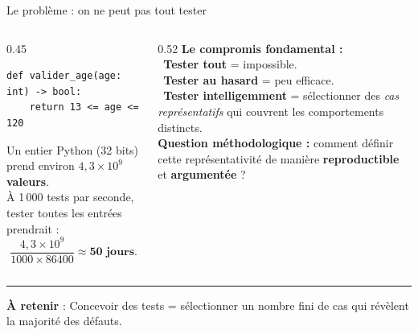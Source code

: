 \documentclass[aspectratio=169,11pt]{beamer}
\newcommand{\takeaway}[1]{%
\vfill\begin{beamercolorbox}[wd=\linewidth,sep=0.4em]{}
\color{accent2}\rule[0.6ex]{1.2em}{1.2pt}\hspace{0.4em}%
\textbf{\color{accent2}\small À retenir} \textcolor{textsoft}{:} %
{\small\color{textmain}#1}
\end{beamercolorbox}}
\newcommand{\oui}[1]{\textcolor{good}{\ding{51}}~#1}
\newcommand{\non}[1]{\textcolor{bad}{\ding{55}}~#1}
\begin{document}
\begin{frame}[fragile,t]{Le probl\`eme : on ne peut pas tout tester}
\begin{columns}[T,onlytextwidth]
\begin{column}{0.45\textwidth}
\begin{lstlisting}[style=pythondark]
def valider_age(age: int) -> bool:
    return 13 <= age <= 120
\end{lstlisting}
\vspace{0.3cm}\footnotesize
Un entier Python (32 bits) prend environ \textbf{$4{,}3 \times 10^9$ valeurs}.\\[0.3em]
À 1\,000 tests par seconde, tester toutes les entrées prendrait :
\[\frac{4{,}3 \times 10^9}{1000 \times 86400} \approx \textbf{50 jours.}\]
\end{column}
\begin{column}{0.52\textwidth}
\vspace{0.1cm}\footnotesize
\textbf{Le compromis fondamental :}\\[0.3em]
\non{\textbf{Tester tout}} = impossible.\\[0.2em]
\non{\textbf{Tester au hasard}} = peu efficace.\\[0.2em]
\oui{\textbf{Tester intelligemment}} = sélectionner des \textit{cas représentatifs} qui couvrent les comportements distincts.\\[0.5em]
\textbf{Question méthodologique :} comment définir cette représentativité de manière \textbf{reproductible} et \textbf{argumentée} ?
\end{column}
\end{columns}
\takeaway{Concevoir des tests = sélectionner un nombre fini de cas qui révèlent la majorité des défauts.}
\end{frame}
\end{document}
